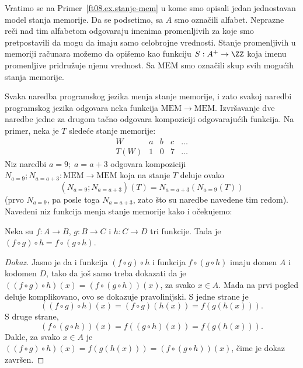 \begin{EX}
  Vratimo se na Primer~\ref{ft08.ex.stanje-mem} u kome smo opisali jedan jednostavan model stanja memorije.
  Da se podsetimo, sa $A$ smo ozna\v cili alfabet. Neprazne re\v ci nad tim alfabetom odgovaraju imenima
  promenljivih za koje smo pretpostavili da mogu da imaju samo celobrojne vrednosti.
  Stanje promenljivih u memoriji ra\v cunara mo\v zemo da opi\v semo kao funkciju $S : A^+ \to \ZZ$
  koja imenu promenljive pridru\v zuje njenu vrednost. Sa $\mathrm{MEM}$ smo ozna\v cili skup svih mogu\'cih stanja memorije.
  
  Svaka naredba programskog jezika menja stanje memorije,
  i zato svakoj naredbi programskog jezika odgovara neka funkcija $\mathrm{MEM} \to \mathrm{MEM}$.
  Izvr\v savanje dve naredbe jedne za drugom ta\v cno odgovara kompoziciji odgovaraju\'cih funkcija.
  Na primer, neka je $T$ slede\'ce stanje memorije:
  $$
    \begin{array}{c|cccc}
      W & a & b & c & \ldots\\
      \hline
      T(W) & 1 & 0 & 7 & \ldots
    \end{array}
  $$
  Niz naredbi $a = 9;\; a = a + 3$ odgovara kompoziciji $N_{a = 9} \mathbin; N_{a = a + 3} : \mathrm{MEM} \to \mathrm{MEM}$
  koja na stanje $T$ deluje ovako
  $$
    (N_{a = 9} \mathbin; N_{a = a + 3})(T) = N_{a = a + 3}(N_{a = 9}(T))
  $$
  (prvo $N_{a = 9}$, pa posle toga $N_{a = a + 3}$, zato \v sto su naredbe navedene tim redom). Navedeni niz funkcija menja
  stanje memorije kako i o\v cekujemo:
  \begin{center}
    
  \end{center}
\end{EX}

\clearpage

\begin{THM}
  Neka su $f : A \to B$, $g : B \to C$ i $h : C \to D$ tri funkcije. Tada je $(f \circ g) \circ h = f \circ (g \circ h)$.
\end{THM}
\begin{proof}[Dokaz]
  Jasno je da i funkcija $(f \circ g) \circ h$ i funkcija $f \circ (g \circ h)$ imaju domen $A$ i kodomen $D$, tako da jo\v s
  samo treba dokazati da je $((f \circ g) \circ h)(x) = (f \circ (g \circ h))(x)$, za svako $x \in A$.
  Mada na prvi pogled deluje komplikovano, ovo se dokazuje pravolinijski. S jedne strane je
  $$
    ((f \circ g) \circ h)(x) = (f \circ g)(h(x)) = f(g(h(x))).
  $$
  S druge strane,
  $$
    (f \circ (g \circ h))(x) = f((g \circ h)(x)) = f(g(h(x))).
  $$
  Dakle, za svako $x \in A$ je $((f \circ g) \circ h)(x) = f(g(h(x))) = (f \circ (g \circ h))(x)$,
  \v cime je dokaz zavr\v sen.
\end{proof}



